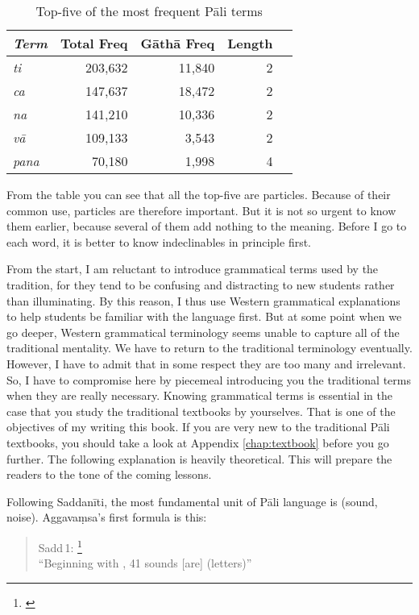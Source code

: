 \begin{table}[!hbt]
\centering\small
\caption{Top-five of the most frequent P\=ali terms}
\label{tab:topfive}
\bigskip
\begin{tabular}{>{\itshape}l*{4}r} \toprule
\upshape Term & Total Freq & G\=ath\=a Freq & Length \\
\midrule
ti & 203,632 & 11,840 & 2 \\
ca & 147,637 & 18,472 & 2 \\
na & 141,210 & 10,336 & 2 \\
v\=a & 109,133 & 3,543 & 2 \\
pana & 70,180 & 1,998 & 4 \\
\bottomrule
\end{tabular}
\end{table}

From the table you can see that all the top-five are particles. Because of their common use, particles are therefore important. But it is not so urgent to know them earlier, because several of them add nothing to the meaning. Before I go to each word, it is better to know indeclinables in principle first. 

From the start, I am reluctant to introduce grammatical terms used by the tradition, for they tend to be confusing and distracting to new students rather than illuminating. By this reason, I thus use Western grammatical explanations to help students be familiar with the language first. But at some point when we go deeper, Western grammatical terminology seems unable to capture all of the traditional mentality. We have to return to the traditional terminology eventually. However, I have to admit that in some respect they are too many and irrelevant. So, I have to compromise here by piecemeal introducing you the traditional terms when they are really necessary. Knowing grammatical terms is essential in the case that you study the traditional textbooks by yourselves. That is one of the objectives of my writing this book. If you are very new to the traditional P\=ali textbooks, you should take a look at Appendix \ref{chap:textbook} before you go further. The following explanation is heavily theoretical. This will prepare the readers to the tone of the coming lessons.

Following Saddan\=iti, the most fundamental unit of P\=ali language is  (sound, noise). Aggava\d msa's first formula is this:

\begin{quote} 
Sadd\,1: \footnote{\citealp[p.~604]{smith:sadd3}}\\
``Beginning with , 41 sounds [are]  (letters)''
\end{quote}
 
